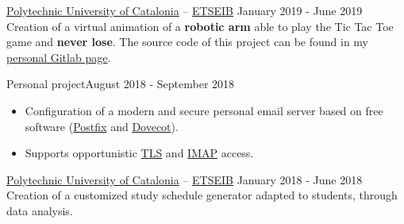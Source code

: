 \documentclass[10pt, a4paper, ragged2e]{altacv}
\begin{document}
\divider

{\href{https://www.upc.edu/en}{Polytechnic University of Catalonia} --
\href{https://etseib.upc.edu/en}{ETSEIB}}
{January 2019 - June 2019}{}
Creation of a virtual animation of a \textbf{robotic arm} able to play the Tic
Tac Toe game and \textbf{never lose}. The source code of this project can be
found in my \href{https://gitlab.com/DavidAlvarez/}{personal Gitlab
  page\footnotemark}.

\divider

{Personal project}{August 2018 - September 2018}{}
\begin{itemize}
  \item Configuration of a modern and secure personal email server based on
  free software (\href{http://www.postfix.org/}{Postfix} and
  \href{https://www.dovecot.org/}{Dovecot}).
  \item Supports opportunistic
  \href{https://en.wikipedia.org/wiki/Transport_Layer_Security}{TLS} and
  \href{https://en.wikipedia.org/wiki/Internet_Message_Access_Protocol}
  {IMAP} access.
\end{itemize}

\divider

{\href{https://www.upc.edu/en}{Polytechnic University of Catalonia} --
\href{https://etseib.upc.edu/en}{ETSEIB}}
{January 2018 - June 2018}{}
Creation of a customized study schedule generator adapted to students, through
data analysis.


\medskip


\end{document}
